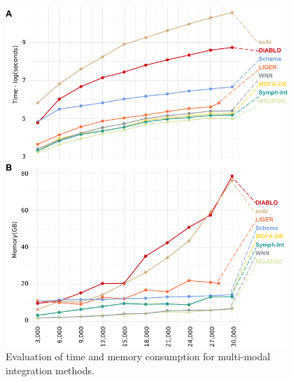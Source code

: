 \begin{figure}[!ht]
	\centering
	\includegraphics[width=0.95\textwidth]{time_memory/fig}
	\vspace{0.1cm}
	\caption[Evaluation of time and memory consumption for multi-modal integration methods.]{Evaluation of time and memory consumption for multi-modal integration methods.}
	\label{fig:time_memory}
\end{figure}

